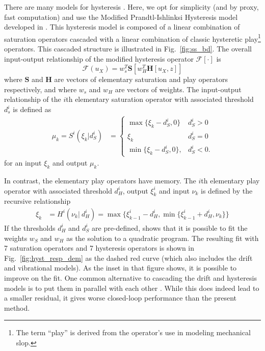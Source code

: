 \documentclass[twocolumn,twoside]{IEEEtran}
\begin{document}
There are many models for hysteresis \cite{croft_creep_1999, rakotondrabe_bouc_2011, Lui_hysteresis_2013}. Here, we opt for simplicity (and by proxy, fast computation) and use the Modified Prandtl-Ishlinksi Hysteresis model developed in \cite{kuhnen_modeling_2003}. This hysteresis model is composed of a linear combination of saturation operators cascaded with a linear combination of classic hysteretic play\footnote{The term ``play'' is derived from the operator's use in modeling mechanical slop.} operators. This cascaded structure is illustrated in Fig.~\ref{fig:ss_bd}. The overall input-output relationship of the modified hysteresis operator $\mathcal{F}[\cdot]$ is
\begin{equation}
  \mathcal{F}(u_X) = w_s^T\mathbf{S}\left[w_H^T \mathbf{H}[u_X, z]\right]
\end{equation}
where $\mathbf{S}$ and $\mathbf{H}$ are vectors of elementary saturation and play operators respectively, and
where $w_s$ and $w_H$ are vectors of weights. The input-output relationship of the $i$th elementary saturation operator with associated threshold $d_s^i$ is defined as
\begin{align}
  \mu_k=
  S^i(\xi_k| d_S^i) &=
  \begin{cases}
    \max\{\xi_k - d_S^i, 0\} & d_S^i >0\\
    \xi_k & d_S^i = 0\\
    \min\{\xi_k-d_S^i, 0\},  & d_S^i<0.
  \end{cases}
\end{align}
for an input $\xi_k$ and output $\mu_k$. 

In contrast, the elementary play operators have memory. The $i$th elementary play operator with associated threshold $d_H^i$, output $\xi_k^i$ and input $\nu_k$ is defined by the recursive relationship
\begin{align}
  \xi_k &=
  H^i(\nu_k|\: d_H^i) =
  \max\{\xi^i_{k-1}-d_H^i, \min\{\xi^i_{k-1} + d_H^i, \nu_k\} \}
\end{align}
If the thresholds $d_H^i$ and $d_S^i$ are pre-defined, \cite{kuhnen_modeling_2003} shows that it is possible to fit the weights $w_S$ and $w_H$ as the solution to a quadratic program. The resulting fit with 7 saturation operators and 7 hysteresis operators is shown in Fig.~\ref{fig:hyst_resp_dem} as the dashed red curve (which also includes the drift and vibrational models). As the inset in that figure shows, it is possible to improve on the fit. One common alternative to cascading the drift and hysteresis models is to put them in parallel with each other \cite{mokaberi_compensation_2008, Krejci_inverse_2001}. While this does indeed lead to a smaller residual, it gives worse closed-loop performance than the present method.
\end{document}
